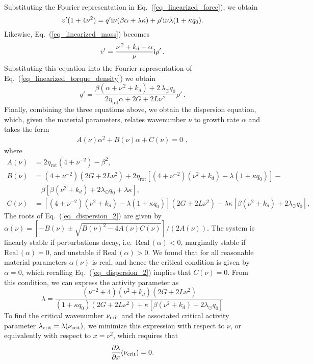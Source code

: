 Substituting the Fourier representation in Eq.~(\ref{eq_linearized_force}), we obtain
\begin{equation}
	v' (1+4\nu^2) = q' \mathrm{i}\nu (\beta \alpha + \lambda\kappa) + \rho' \mathrm{i} \nu \lambda (1+\kappa q_0).
\end{equation}
Likewise, Eq.~(\ref{eq_linearized_mass}) becomes
\begin{equation} \label{eq_fourier_mass}
	v' =   \frac{\nu^{\, 2}  + k_d+\alpha}{ \nu}  \mathrm{i} \rho' \, .
\end{equation}
Substituting this equation into the Fourier representation of Eq.~(\ref{eq_linearized_torque_density}) we obtain
\begin{equation} \label{eq_fourier_torque}
	q'    = \frac{  \beta ( \alpha  + \nu^{\, 2}  + k_d) +  2 \, \lambda_{\odot} q_0   }{2\eta_{\text{rot}} \alpha + 2G + 2L \nu^{\, 2} }  \rho' \, .
\end{equation}
Finally, combining the three equations above, we obtain the dispersion equation, which, given the material parameters, relates  wavenumber $\nu$ to growth rate $\alpha$ and takes the form
\begin{align} \label{eq_dispersion_2}
	A\left (\nu \right)\alpha^2 + B\left (\nu \right)\alpha + C\left (\nu \right)=0 \, \,,
\end{align}
where
\begin{align*}
	A(\nu) & = 2\eta_{\text{rot}} (4+\nu^{-2}) - \beta^2,\\
	B(\nu) & = (4+\nu^{-2}) (2G + 2L \nu^2)+  2\eta_{\text{rot}} \left[ (4+\nu^{-2})(\nu^2+k_d) - \lambda (1+\kappa q_0) \right] - \\ & \quad  \beta \left[\beta(\nu^2+k_d)+   2  \lambda_{\odot} q_0 +\lambda\kappa  \right],\\
	C(\nu) & = \left[   (4+\nu^{-2})(\nu^2+k_d) - \lambda (1+\kappa  q_0 )  \right] (2G+ 2L \nu^2) - \lambda\kappa \left[\beta(\nu^2+k_d)+  2  \lambda_{\odot} q_0  \right],
\end{align*}
The roots of Eq.~(\ref{eq_dispersion_2}) are given by $\alpha(\nu) = \left[-B(\nu) \pm \sqrt{B(\nu)^2 - 4A(\nu)C(\nu)}\right]/(2A(\nu))$. The system is linearly stable if perturbations decay, i.e.~$\text{Real} \, (\alpha)<0$, marginally stable if $\text{Real} \, (\alpha)=0$, and unstable if $\text{Real} \, (\alpha)>0$. We found that for all reasonable material parameters $\alpha(\nu)$ is real, and hence the critical condition is given by $\alpha = 0$, which recalling Eq.~(\ref{eq_dispersion_2}) implies that $C(\nu) =0$. From this condition, we can express the activity parameter as
\begin{equation}
	\label{lam_complete}
	\lambda = \frac{(\nu^{-2}+4)(\nu^2 + k_d)(2G + 2L \nu^2)}{(1+\kappa q_0)(2G + 2L \nu^2) + \kappa \left[\beta(\nu^2+k_d) + 2\lambda_\odot q_0 \right]}
\end{equation}
To find the critical wavenumber $\nu_{\rm crit}$ and the associated critical activity parameter $\lambda_{\rm crit} = \lambda(\nu_{\rm crit})$, we minimize this expression with respect to $\nu$, or equivalently with respect to  $x = \nu^2$, which requires that
\begin{equation}
	\frac{\partial\lambda}{\partial x}(\nu_{\rm crit})=0.
\end{equation}


